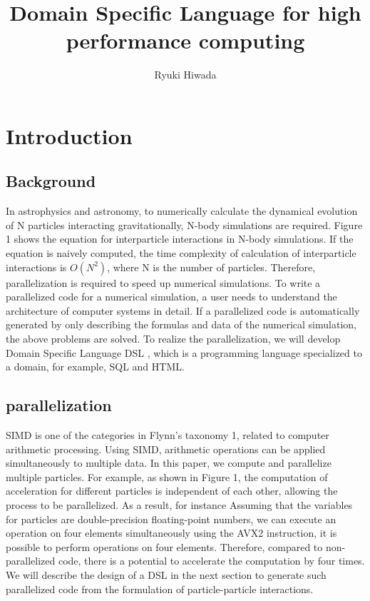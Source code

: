 \documentclass[ams, a4j]{U-AizuGT}
\author{Ryuki Hiwada}
\title{Domain Specific Language for high performance computing}
\begin{document}
\maketitle
\begin{abstract}

\end{abstract}
\section{Introduction}


\subsection{Background}
In astrophysics and astronomy, to numerically calculate the dynamical 
evolution of N particles interacting gravitationally, N-body simulations 
are required. Figure 1 shows the equation for interparticle interactions 
in N-body simulations. If the equation is naively computed, the time
complexity of calculation of interparticle interactions is 
\begin{math}O(N^2) \end{math}, where 
N is the number of particles. Therefore, parallelization is required to
speed up numerical simulations. To write a parallelized code for a 
numerical simulation, a user needs to understand the architecture of 
computer systems in  detail. If a parallelized code is automatically
generated by only describing the formulas and data of the numerical
simulation, the above problems are solved. To realize the parallelization,
we will develop Domain Specific Language  DSL \rparen, which is a 
programming language specialized to a domain, for example, SQL and HTML.
\subsection{parallelization}
SIMD is one of the categories in Flynn's taxonomy 1, related to computer arithmetic
 processing. Using SIMD, arithmetic operations can be applied simultaneously to
multiple data. In this paper, we compute and parallelize multiple particles. For example, 
as shown in Figure 1, the computation of acceleration for different particles is independent
of each other, allowing the process to be parallelized. As a result, for instance Assuming 
that the variables for particles are double-precision floating-point numbers, we can execute 
an operation on four elements simultaneously using the AVX2 instruction, it is possible to 
perform operations on four elements. Therefore, compared to non-parallelized code, there is
a potential to accelerate the computation by four times. We will describe the design of a 
DSL in the next section to generate such parallelized code from the formulation of particle-particle interactions.
\end{document}
